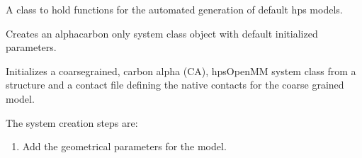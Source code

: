 \documentclass[letterpaper,10pt,english]{sphinxmanual}
\begin{document}
\begin{fulllineitems}
\label{\detokenize{modules/models:hps.core.models}}
\pysigstartsignatures
{}
\pysigstopsignatures
\sphinxAtStartPar
A class to hold functions for the automated generation of default hps models.

\begin{fulllineitems}
\label{\detokenize{modules/models:hps.core.models.__init__}}
\pysigstartsignatures
{}
\pysigstopsignatures
\end{fulllineitems}


\begin{fulllineitems}
\label{\detokenize{modules/models:hps.core.models.buildHPSModel}}
\pysigstartsignatures
{}
\pysigstopsignatures
\sphinxAtStartPar
Creates an alpha\sphinxhyphen{}carbon only  system class object with default
initialized parameters.

\sphinxAtStartPar
Initializes a coarse\sphinxhyphen{}grained, carbon alpha (CA), hpsOpenMM system class
from a structure and a contact file defining the native contacts for the
coarse grained model.

\sphinxAtStartPar
The system creation steps are:
\begin{enumerate}
%
\item {} 
\sphinxAtStartPar
Add the geometrical parameters for the model.


\end{enumerate}
\end{fulllineitems}
\end{fulllineitems}
\end{document}

